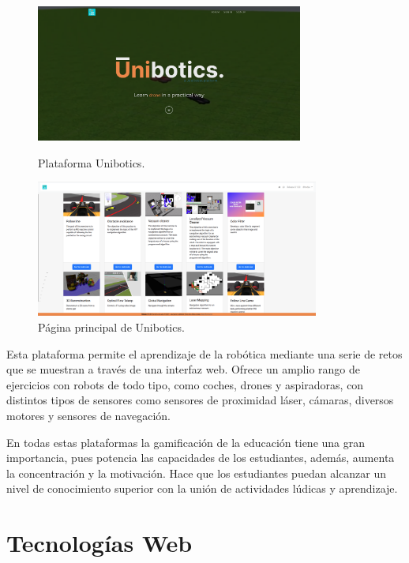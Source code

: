 \documentclass[a4paper, 12pt]{book}
\begin{document}
\begin{figure}[H]
  \centering
  \begin{minipage}[b]{0.45\textwidth}
    \includegraphics[width=\textwidth,height=45mm]{img/plataforma_unibotics.png}
    \caption{Plataforma Unibotics.}
    \label{figura:stun}
  \end{minipage}
  \hfill
  \begin{minipage}[b]{0.45\textwidth}
    \includegraphics[width=\textwidth,height=45mm]{img/pagina_principal_unibotics.png}
    \caption{Página principal de Unibotics.}
    \label{figura:turn}
  \end{minipage}
\end{figure}

Esta plataforma permite el aprendizaje de la robótica mediante una serie de retos que se muestran a través de una interfaz web. Ofrece un amplio rango de ejercicios con robots de todo tipo, como coches, drones y aspiradoras, con distintos tipos de sensores como sensores de proximidad láser, cámaras, diversos motores y sensores de navegación.

En todas estas plataformas la gamificación de la educación tiene una gran importancia, pues potencia las capacidades de los estudiantes, además, aumenta la concentración y la motivación. Hace que los estudiantes puedan alcanzar un nivel de conocimiento superior con la unión de actividades lúdicas y aprendizaje.


\section{Tecnologías Web}
\end{document}
